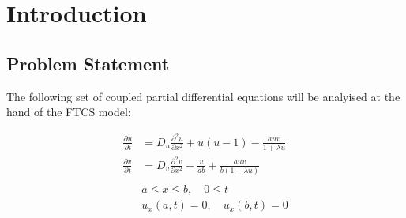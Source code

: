 \section{Introduction}

\subsection{Problem Statement}

The following set of coupled partial differential equations will be
analyised at the hand of the FTCS model:

\begin{align*}
\frac{\partial u}{\partial t} &= D_u \frac{\partial^2 u}{\partial x^2} +
                                 u(u - 1) - \frac{auv}{1+\lambda u} \\
\frac{\partial v}{\partial t} &= D_v \frac{\partial^2 v}{\partial x^2} -
                                 \frac{v}{ab} + \frac{auv}{b(1+\lambda u)} \\
                                 \\
                              & a \leq x \leq b, \quad 0 \leq t \\
                              & u_x(a,t) = 0, \quad u_x(b,t) = 0
\end{align*}
